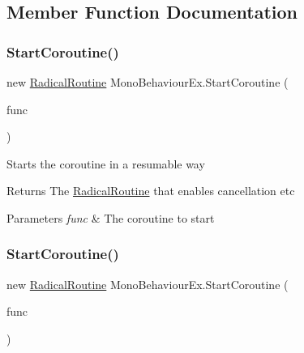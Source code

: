 \subsection{Member Function Documentation}
\mbox{\label{class_mono_behaviour_ex_a2ceccf18e7afb38fb8cdeafed63c8a8e}} 
\subsubsection{\texorpdfstring{Start\+Coroutine()}{StartCoroutine()}\hspace{0.1cm}{\footnotesize\ttfamily [1/2]}}
{\footnotesize\ttfamily new \hyperlink{class_radical_routine}{Radical\+Routine} Mono\+Behaviour\+Ex.\+Start\+Coroutine (\begin{DoxyParamCaption}\item[{I\+Enumerator}]{func }\end{DoxyParamCaption})\hspace{0.3cm}{\ttfamily [inline]}}



Starts the coroutine in a resumable way 

\begin{DoxyReturn}{Returns}
The \hyperlink{class_radical_routine}{Radical\+Routine} that enables cancellation etc 
\end{DoxyReturn}

\begin{DoxyParams}{Parameters}
{\em func} & The coroutine to start \\
\hline
\end{DoxyParams}
\mbox{\label{class_mono_behaviour_ex_aa666e8936e8c6a60869d25cb9e5fbd76}} 
\subsubsection{\texorpdfstring{Start\+Coroutine()}{StartCoroutine()}\hspace{0.1cm}{\footnotesize\ttfamily [2/2]}}
{\footnotesize\ttfamily new \hyperlink{class_radical_routine}{Radical\+Routine} Mono\+Behaviour\+Ex.\+Start\+Coroutine (\begin{DoxyParamCaption}\item[{string}]{func }\end{DoxyParamCaption})\hspace{0.3cm}{\ttfamily [inline]}}



